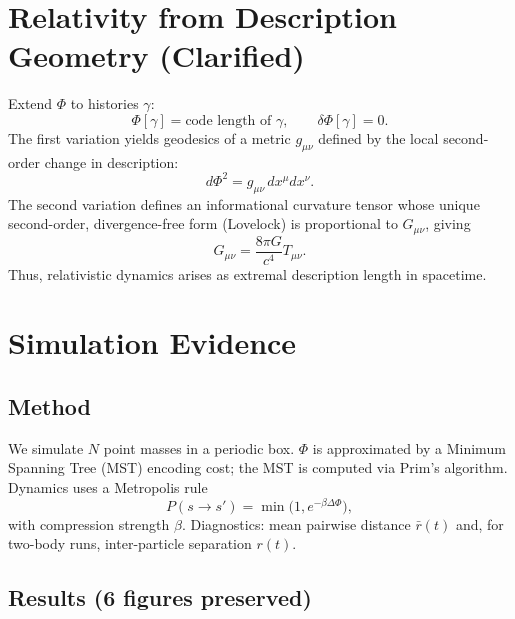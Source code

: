 \documentclass[aps,preprint,onecolumn,longbibliography,nofootinbib]{revtex4-2}
\numberwithin{equation}{section}        %
\begin{document}
\section{Relativity from Description Geometry (Clarified)}
Extend $\Phi$ to histories $\gamma$:
\begin{equation}
\Phi[\gamma] = \text{code length of $\gamma$}, \qquad \delta\Phi[\gamma]=0. \label{eq:worldline}
\end{equation}
The first variation yields geodesics of a metric $g_{\mu\nu}$ defined by the local second-order change in description:
\begin{equation}
d\Phi^2 = g_{\mu\nu}\,dx^\mu dx^\nu. \label{eq:metric}
\end{equation}
The second variation defines an informational curvature tensor whose unique second-order, divergence-free form (Lovelock) is proportional to $G_{\mu\nu}$, giving
\begin{equation}
G_{\mu\nu}=\frac{8\pi G}{c^4}T_{\mu\nu}. \label{eq:einstein}
\end{equation}
Thus, relativistic dynamics arises as extremal description length in spacetime.

\section{Simulation Evidence}
\subsection{Method}
We simulate $N$ point masses in a periodic box. $\Phi$ is approximated by a Minimum Spanning Tree (MST) encoding cost; the MST is computed via Prim's algorithm. Dynamics uses a Metropolis rule
\begin{equation}
P(s\to s')=\min\!\big(1,e^{-\beta\Delta\Phi}\big), \label{eq:metro}
\end{equation}
with compression strength $\beta$. Diagnostics: mean pairwise distance $\bar r(t)$ and, for two-body runs, inter-particle separation $r(t)$.

\subsection{Results (6 figures preserved)}
\end{document}
